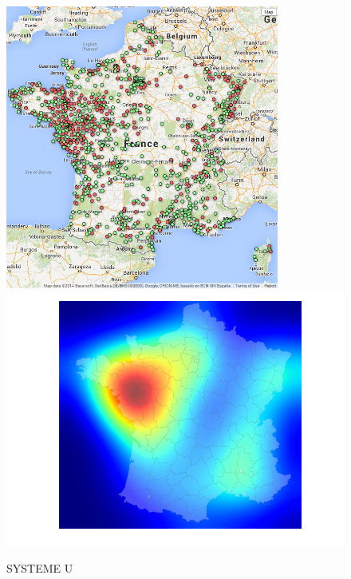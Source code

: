 \documentclass[11pt]{article}
\begin{document}
\begin{figure}[H]
    \caption{SYSTEME U}
	\centering
		\includegraphics[width=9cm]{images/maps_group_dots/SYSTEME_U.png}
        \includegraphics[width=12.8cm]{images/maps_group_heatmaps/SYSTEME_U.png}
\end{figure}
\end{document}
